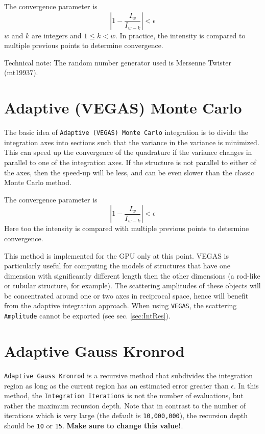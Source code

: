 \documentclass[../D+Manual.tex]{subfiles}
\begin{document}
The convergence parameter is
\begin{equation}
\left|1 - \frac{I_{w}}{I_{w-k}}\right| < \epsilon
\end{equation}
$w$ and $k$ are integers and $1\le k < w$. In practice, the intensity is compared to multiple previous points to determine convergence.

Technical note: The random number generator used is Mersenne Twister (mt19937).

\section{Adaptive (VEGAS) Monte Carlo}
\label{sec:VEGAS}


The basic idea of \texttt{Adaptive (VEGAS) Monte Carlo} integration is to divide the integration axes into sections such that the variance in the variance is minimized. This can speed up the convergence of the quadrature if the variance changes in parallel to one of the integration axes. If the structure is not parallel to either of the axes, then the speed-up will be less, and can be even slower than the classic Monte Carlo method.

The convergence parameter is
\begin{equation}
\left|1 - \frac{I_{w}}{I_{w-k}}\right| < \epsilon
\end{equation}
Here too the intensity is compared with multiple previous points to determine convergence.

This method is implemented for the GPU only at this point. VEGAS is particularly useful for computing the models of structures that have one dimension with significantly different length then the other dimensions (a rod-like or tubular structure, for example). The scattering amplitudes of these objects will be concentrated around one or two axes in reciprocal space, hence will benefit from the adaptive integration approach. When using \texttt{VEGAS}, the scattering \texttt{Amplitude} cannot be exported (see sec. \ref{sec:IntRes}).

\section{Adaptive Gauss Kronrod}

\texttt{Adaptive Gauss Kronrod} is a recursive method that subdivides the integration region as long as the current region has an estimated error greater than $\epsilon$. In this method, the \texttt{Integration Iterations} is not the number of evaluations, but rather the maximum recursion depth. Note that in contrast to the number of iterations which is very large (the default is \texttt{10,000,000}), the recursion depth should be \texttt{10} or \texttt{15}. \textbf{Make sure to change this value!}.
\end{document}
